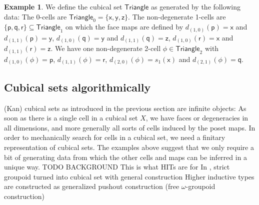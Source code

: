 \documentclass[11pt]{article}
\theoremstyle{definition}
\newtheorem{example}{Example}
\newcommand{\smap}[1]{s_{{#1}}}
\newcommand{\dmap}[2]{d_{({#1} , {#2})}}
\newcommand{\cset}[1]{\mathsf{{#1}}}
\begin{document}

\begin{example}\label{exp:triangle}
  We define the cubical set $\cset{Triangle}$ as generated by the following
  data: The 0-cells are $\cset{Triangle}_0 = \{ \cset{x} , \cset{y} , \cset{z}
  \}$. The non-degenerate 1-cells are $\{ \cset{p} ,
  \cset{q} , \cset{r} \} \subseteq \cset{Triangle}_1$ on which the face maps are defined by
    $\dmap{1}{0}(\cset{p}) = \cset{x}$ and $\dmap{1}{1}(\cset{p}) = \cset{y}$,
    $\dmap{1}{0}(\cset{q}) = \cset{y}$ and $\dmap{1}{1}(\cset{q}) = \cset{z}$,
    $\dmap{1}{0}(\cset{r}) = \cset{x}$ and $\dmap{1}{1}(\cset{r}) = \cset{z}$.
    We have one non-degenerate 2-cell $\cset{\phi} \in \cset{Triangle}_2$ with $\dmap{1}{0}(\cset{\phi}) =
    \cset{p}$, $\dmap{1}{1}(\cset{\phi}) = \cset{r}$, $\dmap{2}{0}(\cset{\phi})
    = \smap{1}(\cset{x})$ and $\dmap{2}{1}(\cset{\phi}) = \cset{q}$.
\end{example}






\subsection{Cubical sets algorithmically}

(Kan) cubical sets as introduced in the previous section are infinite objects:
As soon as there is a single cell in a cubical set $X$, we have faces or
degeneracies in all dimensions, and more generally all sorts of cells induced by
the poset maps. In order to mechanically search for cells in a cubical set, we
need a finitary representation of cubical sets. The examples above suggest that
we only require a bit of generating data from which the other cells and maps can
be inferred in a unique way. TODO BACKGROUND This is what HITs are for In
\cite[Sect. 6.4]{bezem14_model_type_theor_cubic_sets}, strict groupoid turned
into cubical set with general construction Higher inductive types are
constructed as generalized pushout construction (free $\omega$-groupoid
construction)
\end{document}
